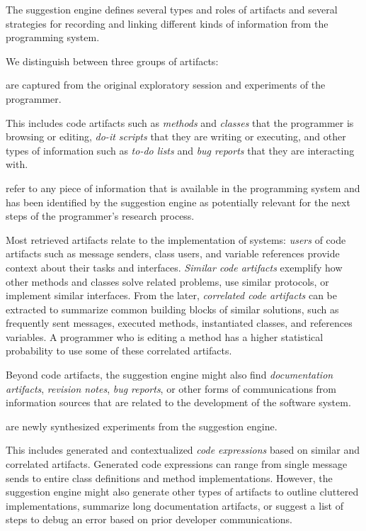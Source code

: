The suggestion engine defines several types and roles of artifacts and several strategies for recording and linking different kinds of information from the programming system.

We distinguish between three groups of artifacts:

\begin{description}[noextralabelsep]
	\item[Input artifacts] are captured from the original exploratory session and experiments of the programmer.

	This includes code artifacts such as \emph{methods} and \emph{classes} that the programmer is browsing or editing, \emph{do-it scripts} that they are writing or executing, and other types of information such as \emph{to-do lists} and \emph{bug reports} that they are interacting with.

	\item[Retrieved artifacts] refer to any piece of information that is available in the programming system and has been identified by the suggestion engine as potentially relevant for the next steps of the programmer's research process.

	Most retrieved artifacts relate to the implementation of systems: \emph{users} of code artifacts such as message senders, class users, and variable references provide context about their tasks and interfaces.
	\emph{Similar code artifacts} exemplify how other methods and classes solve related problems, use similar protocols, or implement similar interfaces.
	From the later, \emph{correlated code artifacts} can be extracted to summarize common building blocks of similar solutions, such as frequently sent messages, executed methods, instantiated classes, and references variables.
	A programmer who is editing a method has a higher statistical probability to use some of these correlated artifacts.

	Beyond code artifacts, the suggestion engine might also find \emph{documentation artifacts}, \emph{revision notes}, \emph{bug reports}, or other forms of communications from information sources that are related to the development of the software system.

	\item[Generated artifacts] are newly synthesized experiments from the suggestion engine.

	This includes generated and contextualized \emph{code expressions} based on similar and correlated artifacts.
	Generated code expressions can range from single message sends to entire class definitions and method implementations.
	However, the suggestion engine might also generate other types of artifacts to outline cluttered implementations, summarize long documentation artifacts, or suggest a list of steps to debug an error based on prior developer communications.
\end{description}

